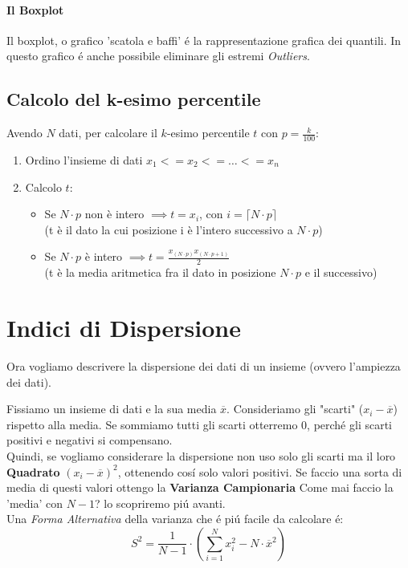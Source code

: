 \paragraph{Il Boxplot}
Il boxplot,  o grafico 'scatola e baffi' é la rappresentazione grafica dei quantili.
In questo grafico é anche possibile eliminare gli estremi \emph{Outliers}.


\subsection{Calcolo del k-esimo percentile}
Avendo $N$ dati, per calcolare il $k$-esimo percentile $t$ con $p=\frac{k}{100}$:
\begin{enumerate}
    \item Ordino l'insieme di dati $x_1 <= x_2 <= \dots <= x_n$
    \item Calcolo $t$:
        \begin{itemize}
            \item Se $N \cdot p$ non è intero $\implies t=x_i$, con $i= \lceil N \cdot p \rceil $
             \\\small{(t è il dato la cui posizione i è l'intero successivo a $N \cdot p$)}
            \item Se $N \cdot p$ è intero $\implies t = \frac{x_{(N\cdot p)} x_{(N \cdot p+1)}}{2}$
            \\\small{(t è la media aritmetica fra il dato in posizione $N \cdot p$ e il successivo)}
        \end{itemize}
\end{enumerate}

\section{Indici di Dispersione}
Ora vogliamo descrivere la dispersione dei dati di un insieme (ovvero l'ampiezza dei dati).

Fissiamo un insieme di dati e la sua media $\overline{x}$.
Consideriamo gli "scarti" ($x_i-\overline{x}$) rispetto alla media. Se sommiamo tutti gli scarti otterremo 0, perché gli scarti positivi e negativi si compensano.
\\Quindi, se vogliamo considerare la dispersione non uso solo gli scarti ma il loro \textbf{Quadrato} $(x_i-\overline{x})^2$, ottenendo cosí solo valori positivi.
Se faccio una sorta di media di questi valori ottengo la \textbf{Varianza Campionaria}
Come mai faccio la 'media' con $N-1$? lo scopriremo piú avanti.
\\Una \emph{Forma Alternativa} della varianza che é piú facile da calcolare é: 
\[
    S^2 = \frac{1}{N-1} \cdot ( \sum_{i=1}^{N} x_i^2- N \cdot \overline{x}^2)  
\]
